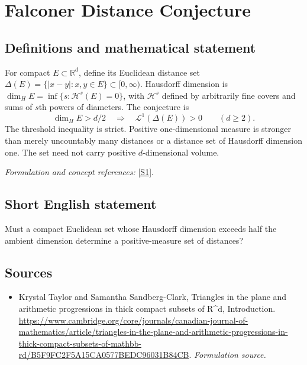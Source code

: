 \documentclass[11pt]{article}
\begin{document}
\section*{\texorpdfstring{Falconer Distance Conjecture}{Falconer Distance Conjecture}}\label{statement}
\subsection{Definitions and mathematical statement}
For compact $E\subset{\mathbb{R}}^d$, define its Euclidean distance set
$\Delta(E)=\{|x-y|:x,y\in E\}\subset[0,\infty)$. Hausdorff dimension is
$\dim_H E=\inf\{s:\mathcal H^s(E)=0\}$, with $\mathcal H^s$ defined by arbitrarily fine covers and sums of $s$th powers of diameters. The conjecture is
\[
 \dim_H E>d/2\quad\Longrightarrow\quad \mathcal L^1(\Delta(E))>0
 \qquad(d\ge2).
\]
The threshold inequality is strict. Positive one-dimensional measure is stronger than merely uncountably many distances or a distance set of Hausdorff dimension one. The set need not carry positive $d$-dimensional volume.
\par\smallskip\textit{Formulation and concept references:} \href{https://www.cambridge.org/core/journals/canadian-journal-of-mathematics/article/triangles-in-the-plane-and-arithmetic-progressions-in-thick-compact-subsets-of-mathbb-rd/B5F9FC2F5A15CA0577BEDC96031B84CB}{[S1]}.

\subsection{Short English statement}
Must a compact Euclidean set whose Hausdorff dimension exceeds half the ambient dimension determine a positive-measure set of distances?
\subsection{Sources}
\begin{itemize}
\item[S1]Krystal Taylor and Samantha Sandberg-Clark, Triangles in the plane and arithmetic progressions in thick compact subsets of R\textasciicircum{}d, Introduction.
\url{https://www.cambridge.org/core/journals/canadian-journal-of-mathematics/article/triangles-in-the-plane-and-arithmetic-progressions-in-thick-compact-subsets-of-mathbb-rd/B5F9FC2F5A15CA0577BEDC96031B84CB}.
\textit{Formulation source.}
\end{itemize}
\end{document}

